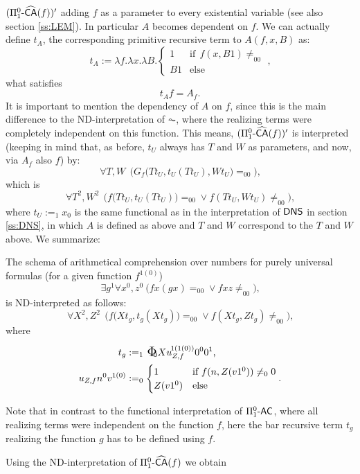 $(\Pi^0_1\textsf{\upshape -}\widehat{\textsf{\upshape CA}}(f))'$ adding $f$ as a parameter to every existential variable
(see also section \ref{ss:LEM}). In particular $A$ becomes dependent on
$f$. We can actually define $t_A$, the corresponding primitive recursive
term to $A(f,x,B)$ as:
\[
   t_A:=\lambda f.\lambda x.\lambda B.
    \begin{cases}
      1&\text{if}\ \ f(x,B1)\neq_00\\
      B1&\text{else}
    \end{cases}
\text{,}\]
what satisfies
\[
   t_Af=A_f
\text{.}\]
It is important to mention the dependency of $A$ on $f$, since this is the main 
difference to the ND-interpretation of $\AC$, where the realizing terms 
were completely independent on this function. %
This means, $(\Pi^0_1\textsf{\upshape -}\widehat{\textsf{\upshape CA}}(f))'$ is interpreted (keeping in mind that,
as before, $t_U$ always has $T$ and $W$ as parameters, and now, via $A_f$ also $f$) by:
\[
  \forall T,W\ \ \Big(G_{f}\big(Tt_U,t_U(Tt_U),Wt_U\big)=_00\Big)
\text{,}\]
which is
\[
  \forall T^2,W^2\ \ \Big(f\big(Tt_U,t_U(Tt_U)\big)=_00 \vee f(Tt_U,Wt_U)\neq_00\Big)\text{,}
\]
where $t_U:=_1 x_0$ is the same functional as in the interpretation of $\textsf{\upshape DNS}$ in 
section \ref{ss:DNS}, in which $A$ is defined as above and $T$ and $W$ correspond
to the $T$ and $W$ above. We summarize:
\begin{prop}\label{p:NDPiLCAhut}
The schema of arithmetical comprehension over numbers for purely universal
formulas (for a given function $f^{1(0)}$)
\[
\exists g^1 \forall x^0,z^0\ \big(fx(gx)=_00 \vee fxz\neq_00\big)\text{,}
\]
is ND-interpreted as follows:
\[
  \forall X^2,Z^2\ \ \Big(f\big(Xt_g,t_g(Xt_g)\big)=_00 \vee f(Xt_g,Zt_g)\neq_00\Big)\text{,}
\]
where
\begin{align*}
t_g&:=_1\xTWf{X}{Z}{f}\text{,}\\
u_{Z,f}n^0v^{1(0)}&:=_0\uWf{Z}{f}
\text{.}
\end{align*}
\end{prop}
\begin{rmk}Note that in contrast to the functional interpretation of
$\Pi^0_1\textsf{\upshape -}\textsf{\upshape AC}$, where all realizing terms were independent on the function $f$, 
here the bar recursive term $t_g$ realizing the function $g$
has to be defined using $f$.\end{rmk}
Using the ND-interpretation of $\Pi^0_1\textsf{\upshape -}\widehat{\textsf{\upshape CA}}(f)$ we obtain
